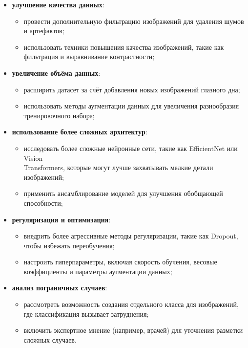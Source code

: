 {    \begin{itemize}
        \item \textbf{улучшение качества данных}:
        \begin{itemize}
            \item провести дополнительную фильтрацию изображений для удаления шумов и артефактов;
            \item использовать техники повышения качества изображений, такие как фильтрация и выравнивание контрастности;
        \end{itemize}
        
        \item \textbf{увеличение объёма данных}:
        \begin{itemize}
            \item расширить датасет за счёт добавления новых изображений глазного дна;
            \item использовать методы аугментации данных для увеличения разнообразия тренировочного набора;
        \end{itemize}
        
        \item \textbf{использование более сложных архитектур}:
        \begin{itemize}
            \item исследовать более сложные нейронные сети, такие как EfficientNet или Vision \\ Transformers, которые могут лучше захватывать мелкие детали изображений;
            \item применить ансамблирование моделей для улучшения обобщающей способности;
        \end{itemize}
        
        \item \textbf{регуляризация и оптимизация}:
        \begin{itemize}
            \item внедрить более агрессивные методы регуляризации, такие как Dropout, чтобы избежать переобучения;
            \item настроить гиперпараметры, включая скорость обучения, весовые коэффициенты и параметры аугментации данных;
        \end{itemize}
        
        \item \textbf{анализ пограничных случаев}:
        \begin{itemize}
            \item рассмотреть возможность создания отдельного класса для изображений, где классификация вызывает затруднения;
            \item включить экспертное мнение (например, врачей) для уточнения разметки сложных случаев.
        \end{itemize}
    \end{itemize}

}
